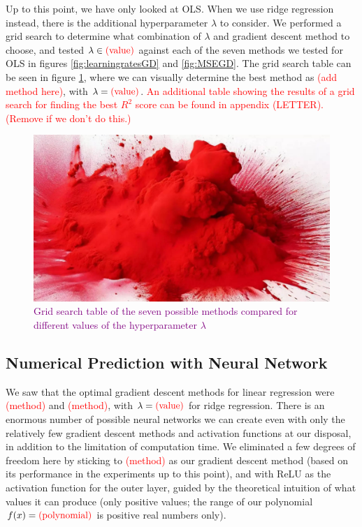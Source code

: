 Up to this point, we have only looked at OLS. When we use ridge regression instead, there is the additional hyperparameter $\lambda$ to consider. We performed a grid search to determine what combination of $\lambda$ and gradient descent method to choose, and tested $\lambda \in \text{\textcolor{red}{(value)}}$ against each of the seven methods we tested for OLS in figures \ref{fig:learningratesGD} and \ref{fig:MSEGD}. The grid search table can be seen in figure \ref{fig:gridsearch_ridge}, where we can visually determine the best method as \textcolor{red}{(add method here)}, with $\lambda = \text{\textcolor{red}{(value)}}$. \textcolor{red}{An additional table showing the results of a grid search for finding the best $R^2$ score can be found in appendix (LETTER). (Remove if we don't do this.)} 
\begin{figure}
    \centering
    \includegraphics[width=0.5\linewidth]{figures/placeholders/gridsearch_ridge.png}
    \caption{\textcolor{purple}{Grid search table of the seven possible methods compared for different values of the hyperparameter $\lambda$}}
    \label{fig:gridsearch_ridge}
\end{figure}

\subsection{Numerical Prediction with Neural Network}
We saw that the optimal gradient descent methods for linear regression were \textcolor{red}{(method)} and \textcolor{red}{(method)}, with $\lambda = \text{\textcolor{red}{(value)}}$ for ridge regression. There is an enormous number of possible neural networks we can create even with only the relatively few gradient descent methods and activation functions at our disposal, in addition to the limitation of computation time. We eliminated a few degrees of freedom here by sticking to \textcolor{red}{(method)} as our gradient descent method (based on its performance in the experiments up to this point), and with ReLU as the activation function for the outer layer, guided by the theoretical intuition of what values it can produce (only positive values; the range of our polynomial $f(x) = \text{\textcolor{red}{(polynomial)}}$ is positive real numbers only).

